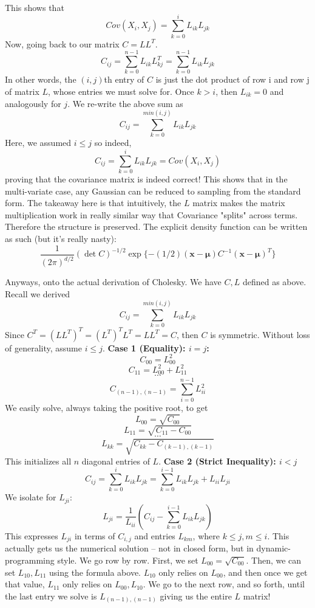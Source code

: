 \documentclass{article}
\begin{document}
This shows that $$ Cov(X_i, X_j) = \sum_{k=0}^{i}L_{ik}L_{jk}$$
Now, going back to our matrix $C = LL^T$. 
$$C_{ij}  = \sum_{k = 0}^{n-1} L_{ik} L^T_{kj} = \sum_{k = 0}^{n-1} L_{ik} L_{jk} $$ 
In other words, the $(i,j)$th entry of $C$ is just the dot product of row i and row j of matrix $L$, whose entries we must solve for. Once $k > i$, then $L_{ik} = 0$ and analogously for $j$. We re-write the above sum as 
$$  C_{ij} = \sum_{k = 0}^{min(i,j)} L_{ik} L_{jk}$$
Here, we assumed $i \leq j$ so indeed, 
$$  C_{ij} = \sum_{k = 0}^{i} L_{ik} L_{jk} = Cov(X_i, X_j)$$
proving that the covariance matrix is indeed correct! 
This shows that in the multi-variate case, any Gaussian can be reduced to sampling from the standard form. \bigskip
\newline
The takeaway here is that intuitively, the $L$ matrix makes the matrix multiplication work in really similar way that Covariance "splits" across terms. Therefore the structure is preserved. 
The explicit density function can be written as such (but it's really nasty): 
$$ \frac{1}{(2\pi)^{d/2}} (\det C)^{-1/2} \exp \{ -(1/2)(\mathbf{x}-\boldsymbol{\mu})C^{-1}(\mathbf{x}-\boldsymbol{\mu})^T \}$$

\bigskip
\noindent Anyways, onto the actual derivation of Cholesky. We have $C,L$ defined as above.  
Recall we derived 
$$  C_{ij} = \sum_{k = 0}^{min(i,j)} L_{ik} L_{jk}$$
Since $C^T = (LL^T)^T = (L^T)^TL^T = LL^T = C$, then $C$ is symmetric. Without loss of generality, assume $i \leq  j$. 
\newline
\textbf{Case 1 (Equality): $ i = j$: }
$$C_{00} = L_{00}^2$$
$$C_{11} = L_{00}^2+L_{11}^2$$
$$ \cdots $$
$$C_{(n-1),(n-1)} = \sum_{i=0}^{n-1}L_{ii}^2$$
We easily solve, always taking the positive root, to get 
$$ L_{00} = \sqrt{C_{00}}$$
$$ L_{11} = \sqrt{C_{11} - C_{00}}$$
$$ \cdots $$
$$ L_{kk} = \sqrt{C_{kk} - C_{(k-1),(k-1)}}$$
This initializes all $n$ diagonal entries of $L$. 
\newline
\textbf{Case 2 (Strict Inequality): $ i < j$ }
$$ C_{ij} = \sum_{k = 0}^{i} L_{ik} L_{jk} = \sum_{k=0}^{i-1}L_{ik} L_{jk} + L_{ii}L_{ji}$$
We isolate for $L_{ji}$:  
$$ L_{ji} = \frac{1}{L_{ii}}(C_{ij} - \sum_{k=0}^{i-1}L_{ik} L_{jk})$$
This expresses $L_{ji}$ in terms of $C_{i,j}$ and entries $L_{km}$, where $k \leq j, m \leq i$. This actually gets us the numerical solution -- not in closed form, but in dynamic-programming style. \bigskip
\newline
We go row by row. 
First, we set $L_{00} = \sqrt{C_{00}}$. Then, we can set $L_{10}, L_{11}$ using the formula above. $L_{10}$ only relies on $L_{00}$, and then once we get that value, $L_{11}$ only relies on $L_{00}, L_{10}$. We go to the next row, and so forth, until the last entry we solve is $L_{(n-1), (n-1)}$ giving us the entire $L$ matrix! 
\end{document}

